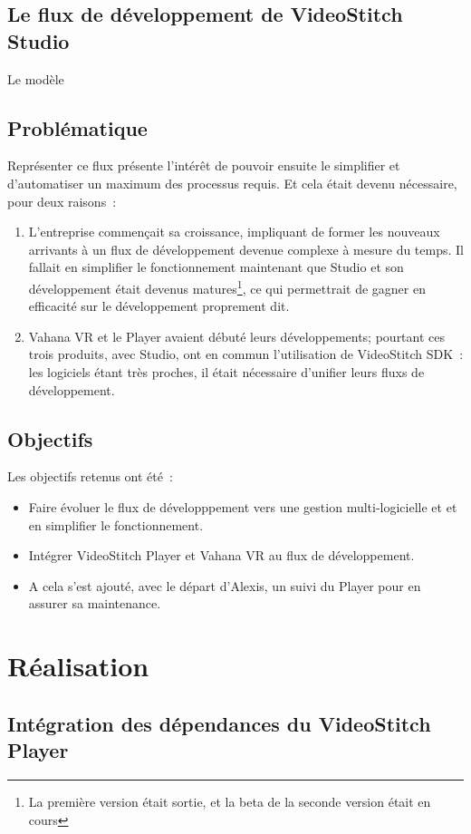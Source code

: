 \subsection{Le flux de développement de VideoStitch Studio} 
Le modèle 

\subsection{Problématique}
Représenter ce flux présente l'intérêt de pouvoir ensuite le simplifier et d'automatiser
un maximum des processus requis. Et cela était devenu nécessaire, pour deux raisons~:
\begin{enumerate}
  \item L'entreprise commençait sa croissance, impliquant de former les nouveaux arrivants
  à un flux de développement devenue complexe à mesure du temps. Il fallait en
  simplifier le fonctionnement maintenant que Studio et son développement était
  devenus matures\footnote{La première version était sortie, et la beta de la seconde
  version était en cours}, ce qui permettrait de gagner en efficacité sur le développement
  proprement dit.
  \item Vahana VR et le Player avaient débuté leurs développements; pourtant ces trois
  produits, avec Studio, ont en commun l'utilisation de VideoStitch SDK~: les logiciels
  étant très proches, il était nécessaire d'unifier leurs fluxs de développement.
\end{enumerate}

\subsection{Objectifs}
Les objectifs retenus ont été~:
\begin{itemize}
  \item Faire évoluer le flux de développpement vers une gestion multi-logicielle et 
  et en simplifier le fonctionnement.
  \item Intégrer VideoStitch Player et Vahana VR au flux de développement.
  \item A cela s'est ajouté, avec le départ d'Alexis, un suivi du Player pour en assurer
  sa maintenance.
\end{itemize}


\section{Réalisation}
\subsection{Intégration des dépendances du VideoStitch Player}

